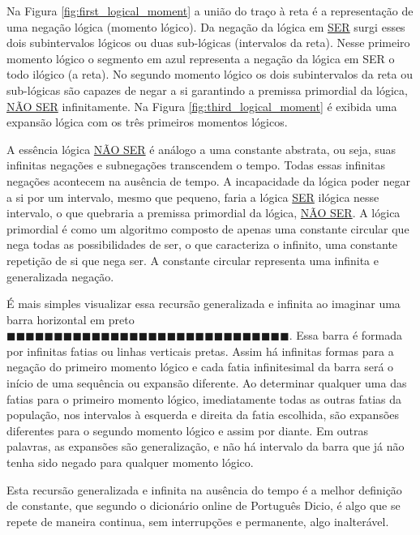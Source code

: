 Na Figura \ref{fig:first_logical_moment} a união do traço à reta é a representação de uma negação lógica (momento lógico). Da negação da lógica em \underline{SER} surgi esses dois subintervalos lógicos ou duas sub-lógicas (intervalos da reta). Nesse primeiro momento lógico o segmento em azul representa a negação da lógica em SER o todo ilógico (a reta). No segundo momento lógico os dois subintervalos da reta ou sub-lógicas são capazes de negar a si garantindo a premissa primordial da lógica, \underline{NÃO SER} infinitamente. Na Figura \ref{fig:third_logical_moment} é exibida uma expansão lógica com os três primeiros momentos lógicos.

A essência lógica \underline{NÃO SER} é análogo a uma constante abstrata, ou seja, suas infinitas negações e subnegações transcendem o tempo. Todas essas infinitas negações acontecem na ausência de tempo. A incapacidade da lógica poder negar a si por um intervalo, mesmo que pequeno, faria a lógica \underline{SER} ilógica nesse intervalo, o que quebraria a premissa primordial da lógica, \underline{NÃO SER}. A lógica primordial é como um algoritmo composto de apenas uma constante circular que nega todas as possibilidades de ser, o que caracteriza o infinito, uma constante repetição de si que nega ser. A constante circular representa uma infinita e generalizada negação.

É mais simples visualizar essa recursão generalizada e infinita ao imaginar uma barra horizontal em preto $\!\blacksquare\!\blacksquare\!\blacksquare\!\blacksquare\!\blacksquare\!\blacksquare\!\blacksquare\!\blacksquare\!\blacksquare\!\blacksquare\!\blacksquare\!\blacksquare\!\blacksquare\!\blacksquare\!\blacksquare\!\blacksquare\!\blacksquare\!\blacksquare\!\blacksquare\!\blacksquare\!\blacksquare\!\blacksquare\!\blacksquare\!\blacksquare\!\blacksquare\!\blacksquare\!\blacksquare\!\blacksquare\!\blacksquare\!\blacksquare$. Essa barra é formada por infinitas fatias ou linhas verticais pretas. Assim há infinitas formas para a negação do primeiro momento lógico e cada fatia infinitesimal da barra será o início de uma sequência ou expansão diferente. Ao determinar qualquer uma das fatias para o primeiro momento lógico, imediatamente todas as outras fatias da população, nos intervalos à esquerda e direita da fatia escolhida, são expansões diferentes para o segundo momento lógico e assim por diante. Em outras palavras, as expansões são generalização, e não há intervalo da barra que já não tenha sido negado para qualquer momento lógico. 

Esta recursão generalizada e infinita na ausência do tempo é a melhor definição de constante, que segundo o dicionário online de Português Dicio\cite{dicio_constante}, é algo que se repete de maneira continua, sem interrupções e permanente, algo inalterável.

